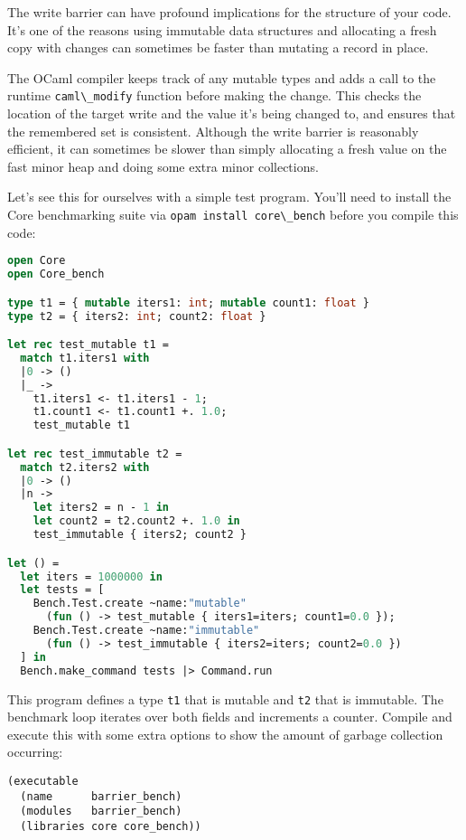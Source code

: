 The write barrier can have profound implications for the structure of
your code. It's one of the reasons using immutable data structures and
allocating a fresh copy with changes can sometimes be faster than
mutating a record in place.

The OCaml compiler keeps track of any mutable types and adds a call to
the runtime \passthrough{\lstinline!caml\_modify!} function before
making the change. This checks the location of the target write and the
value it's being changed to, and ensures that the remembered set is
consistent. Although the write barrier is reasonably efficient, it can
sometimes be slower than simply allocating a fresh value on the fast
minor heap and doing some extra minor collections.

Let's see this for ourselves with a simple test program. You'll need to
install the Core benchmarking suite via
\passthrough{\lstinline!opam install core\_bench!} before you compile
this code:

\begin{lstlisting}[language=Caml]
open Core
open Core_bench

type t1 = { mutable iters1: int; mutable count1: float }
type t2 = { iters2: int; count2: float }

let rec test_mutable t1 =
  match t1.iters1 with
  |0 -> ()
  |_ ->
    t1.iters1 <- t1.iters1 - 1;
    t1.count1 <- t1.count1 +. 1.0;
    test_mutable t1

let rec test_immutable t2 =
  match t2.iters2 with
  |0 -> ()
  |n ->
    let iters2 = n - 1 in
    let count2 = t2.count2 +. 1.0 in
    test_immutable { iters2; count2 }

let () =
  let iters = 1000000 in
  let tests = [
    Bench.Test.create ~name:"mutable"
      (fun () -> test_mutable { iters1=iters; count1=0.0 });
    Bench.Test.create ~name:"immutable"
      (fun () -> test_immutable { iters2=iters; count2=0.0 })
  ] in
  Bench.make_command tests |> Command.run
\end{lstlisting}

This program defines a type \passthrough{\lstinline!t1!} that is mutable
and \passthrough{\lstinline!t2!} that is immutable. The benchmark loop
iterates over both fields and increments a counter. Compile and execute
this with some extra options to show the amount of garbage collection
occurring:

\begin{lstlisting}
(executable
  (name      barrier_bench)
  (modules   barrier_bench)
  (libraries core core_bench))
\end{lstlisting}

